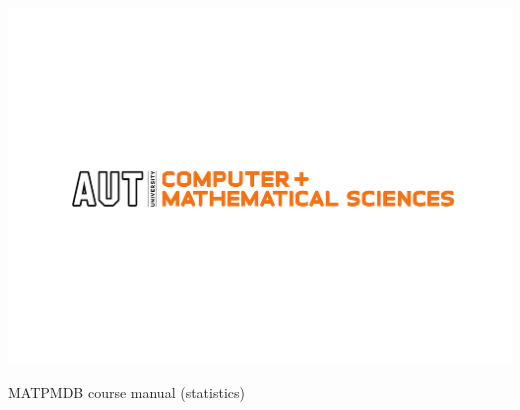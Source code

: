 
\includegraphics{AUT_COMP_MATH_CMYK}

\begin{centering}
{\Huge MATPMDB course manual (statistics)}
\end{centering}


